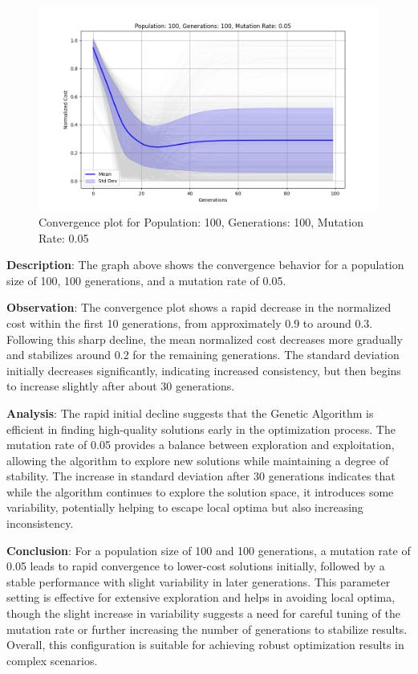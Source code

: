 \documentclass{article}
\begin{document}
    \begin{figure}[H]
        \centering
        \includegraphics[width=\textwidth]{genetic_algorithm/Population_100_Generations_100_MutationRate_0.05}
        \caption{Convergence plot for Population: 100, Generations: 100, Mutation Rate: 0.05}
        \label{fig:ga_100_100_05}
    \end{figure}

    \textbf{Description}: The graph above shows the convergence behavior for a population size of 100, 100 generations, and a mutation rate of 0.05.

    \textbf{Observation}: The convergence plot shows a rapid decrease in the normalized cost within the first 10 generations, from approximately 0.9 to around 0.3. Following this sharp decline, the mean normalized cost decreases more gradually and stabilizes around 0.2 for the remaining generations. The standard deviation initially decreases significantly, indicating increased consistency, but then begins to increase slightly after about 30 generations.

    \textbf{Analysis}: The rapid initial decline suggests that the Genetic Algorithm is efficient in finding high-quality solutions early in the optimization process. The mutation rate of 0.05 provides a balance between exploration and exploitation, allowing the algorithm to explore new solutions while maintaining a degree of stability. The increase in standard deviation after 30 generations indicates that while the algorithm continues to explore the solution space, it introduces some variability, potentially helping to escape local optima but also increasing inconsistency.

    \textbf{Conclusion}: For a population size of 100 and 100 generations, a mutation rate of 0.05 leads to rapid convergence to lower-cost solutions initially, followed by a stable performance with slight variability in later generations. This parameter setting is effective for extensive exploration and helps in avoiding local optima, though the slight increase in variability suggests a need for careful tuning of the mutation rate or further increasing the number of generations to stabilize results. Overall, this configuration is suitable for achieving robust optimization results in complex scenarios.
\end{document}
